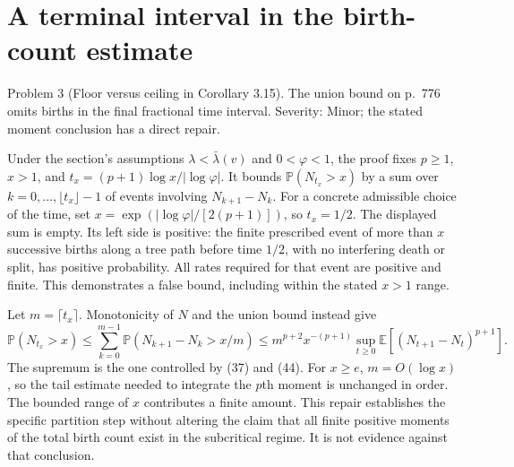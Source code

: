 \documentclass[10pt]{article}
\begin{document}
\section*{A terminal interval in the birth-count estimate}
Problem 3 (Floor versus ceiling in Corollary 3.15).  The union bound on p. 776 omits births in the final fractional time interval. Severity: Minor; the stated moment conclusion has a direct repair.\par
Under the section’s assumptions \(\lambda<\bar\lambda(v)\) and \(0<\varphi<1\), the proof fixes \(p\geq1\), \(x>1\), and \(t_x=(p+1)\log x/|\log\varphi|\). It bounds \(\mathbb P(N_{t_x}>x)\) by a sum over \(k=0,\ldots,\lfloor t_x\rfloor-1\) of events involving \(N_{k+1}-N_k\). For a concrete admissible choice of the time, set \(x=\exp(|\log\varphi|/[2(p+1)])\), so \(t_x=1/2\). The displayed sum is empty. Its left side is positive: the finite prescribed event of more than \(x\) successive births along a tree path before time \(1/2\), with no interfering death or split, has positive probability. All rates required for that event are positive and finite. This demonstrates a false bound, including within the stated \(x>1\) range.\par
Let \(m=\lceil t_x\rceil\). Monotonicity of \(N\) and the union bound instead give \[\mathbb P(N_{t_x}>x)
 \leq \sum_{k=0}^{m-1}\mathbb P(N_{k+1}-N_k>x/m)
 \leq m^{p+2}x^{-(p+1)}
       \sup_{t\geq0}\mathbb E[(N_{t+1}-N_t)^{p+1}].\] The supremum is the one controlled by (37) and (44). For \(x\geq e\), \(m=O(\log x)\), so the tail estimate needed to integrate the \(p\)th moment is unchanged in order. The bounded range of \(x\) contributes a finite amount. This repair establishes the specific partition step without altering the claim that all finite positive moments of the total birth count exist in the subcritical regime. It is not evidence against that conclusion.\par
\end{document}

